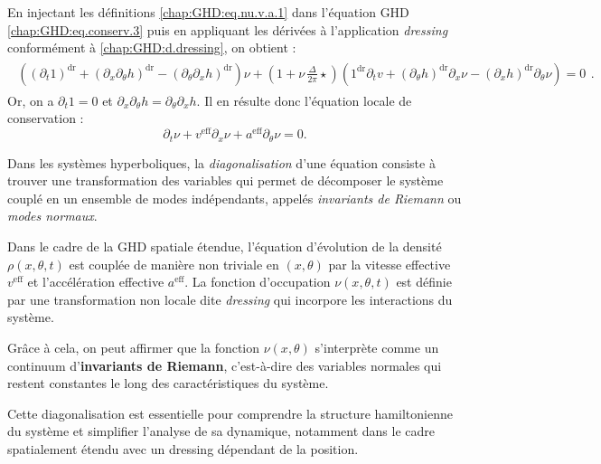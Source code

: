 \medskip

En injectant les définitions \eqref{chap:GHD:eq.nu.v.a.1} dans l'équation GHD \eqref{chap:GHD:eq.conserv.3} puis en appliquant les dérivées à l'application \emph{dressing} conformément à \eqref{chap:GHD:d.dressing}, on obtient :  
\begin{eqnarray}
	\begin{array}{c}\left ( \left(\partial_t 1 \right)^{\mathrm{dr}} + \left(\partial_x  \partial_\theta h  \right)^{\mathrm{dr}} - \left(\partial_\theta  \partial_x h  \right)^{\mathrm{dr}} \right ) \nu + \left ( 1 + \nu \,  \frac{\Delta}{2 \pi } \star  \right ) \left ( 1^{\mathrm{dr}} \partial_t v +  \left ( \partial_\theta h \right )^{\mathrm{dr}} \partial_x \nu -  \left ( \partial_x h \right )^{\mathrm{dr}} \partial_\theta \nu\right ) = 0  \end{array}. 
\end{eqnarray}
Or, on a \(\partial_t 1 = 0\) et \(\partial_x \partial_\theta h = \partial_\theta \partial_x h\). Il en résulte donc l'équation locale de conservation :  
\begin{equation}\label{chap:GHD:eq.nu.1}
	\partial_t \nu + v^{\mathrm{eff}}\partial_x \nu
	+ a^{\mathrm{eff}} \partial_\theta \nu = 0.
\end{equation}  

\medskip

Dans les systèmes hyperboliques, la \emph{diagonalisation} d'une équation consiste à trouver une transformation des variables qui permet de décomposer le système couplé en un ensemble de modes indépendants, appelés \emph{invariants de Riemann} ou \emph{modes normaux}. 

\medskip

Dans le cadre de la GHD spatiale étendue, l'équation d'évolution de la densité \(\rho(x,\theta,t)\) est couplée de manière non triviale en \((x,\theta)\) par la vitesse effective \(v^{\mathrm{eff}}\) et l'accélération effective \(a^{\mathrm{eff}}\). La fonction d'occupation \(\nu(x,\theta,t)\) est définie par une transformation non locale dite \emph{dressing} qui incorpore les interactions du système.

\medskip

Grâce à cela, on peut affirmer que la fonction $\nu (x , \theta)$  s’interprète comme un continuum d’{\bf invariants de Riemann}, c’est-à-dire des variables normales qui restent constantes le long des caractéristiques du système.

\medskip

Cette diagonalisation est essentielle pour comprendre la structure hamiltonienne du système et simplifier l'analyse de sa dynamique, notamment dans le cadre spatialement étendu avec un dressing dépendant de la position. 






